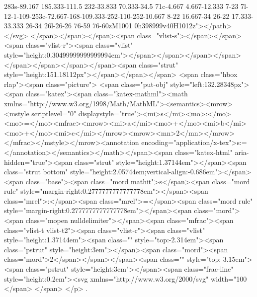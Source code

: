  283s-89.167 185.333-111.5 232-33.833 70.333-34.5 71c-4.667 4.667-12.333 7-23
 7l-12-1-109-253c-72.667-168-109.333-252-110-252-10.667 8-22 16.667-34 26-22
 17.333-33.333 26-34 26l-26-26 76-59 76-60zM1001 0h398999v40H1012z"></path></svg>
</span></span></span><span class="vlist-s">​</span></span><span class="vlist-r"><span class="vlist" style="height:0.30499999999999994em"></span></span></span></span></span></span></span></span><span class="strut" style="height:151.18112px"></span></span></span> <span class="hbox rlap"><span class="picture">
<span class="put-obj" style="left:132.28348px"><span class="katex"><span class="katex-mathml"><math xmlns="http://www.w3.org/1998/Math/MathML"><semantics><mrow><mstyle scriptlevel="0" displaystyle="true"><mi>s</mi><mo>:</mo><mo>=</mo><mfrac><mrow><mi>a</mi><mo>+</mo><mi>b</mi><mo>+</mo><mi>c</mi></mrow><mrow><mn>2</mn></mrow></mfrac></mstyle></mrow><annotation encoding="application/x-tex">\displaystyle s:=</annotation></semantics></math></span><span class="katex-html" aria-hidden="true"><span class="strut" style="height:1.37144em"></span><span class="strut bottom" style="height:2.05744em;vertical-align:-0.686em"></span><span class="base"><span class="mord mathit">s</span><span class="mord rule" style="margin-right:0.2777777777777778em"></span><span class="mrel">:</span><span class="mrel">=</span><span class="mord rule" style="margin-right:0.2777777777777778em"></span><span class="mord"><span class="mopen nulldelimiter"></span><span class="mfrac"><span class="vlist-t vlist-t2"><span class="vlist-r"><span class="vlist" style="height:1.37144em"><span class="" style="top:-2.314em"><span class="pstrut" style="height:3em"></span><span class="mord"><span class="mord">2</span></span></span><span class="" style="top:-3.15em"><span class="pstrut" style="height:3em"></span><span class="frac-line" style="height:0.2em"><svg xmlns="http://www.w3.org/2000/svg" width="100%
</span>​ </span>
</p>
.